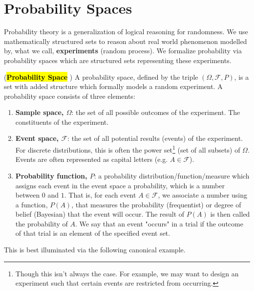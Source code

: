 \section{Probability Spaces} 

Probability theory is a generalization of logical reasoning for randomness. We use mathematically structured sets to reason about real world phenomenon modelled by, what we call, \textbf{experiments} (random process). We formalize probability via probability spaces which are structured sets representing these experiments. 

\begin{df}(\textbf{\hl{Probability Space}} \cite{deisenroth2020mathematics, enwiki:probabilityspace}) 
A probability space, defined by the triple $(\Omega, \mathcal{F}, P)$, is a set with added structure which formally models a random experiment. A probability space consists of three elements:  
\begin{enumerate}
    \item \textbf{Sample space, $\Omega$}: the set of all possible outcomes of the experiment. The constituents of the experiment. 
    \item \textbf{Event space, $\mathcal{F}$}: the set of all potential results (events) of the experiment. For discrete distributions, this is often the power set\footnote{Though this isn't always the case. For example, we may want to design an experiment such that certain events are restricted from occurring.} (set of all subsets) of $\Omega$. Events are often represented as capital letters (e.g. $A \in \mathcal{F}$). 
    \item \textbf{Probability function, $P$}: a probability distribution/function/measure which assigns each event in the event space a probability, which is a number between $0$ and $1$. That is, for each event $A \in \mathcal{F}$, we associate a number using a function, $P(A)$, that measures the probability (frequentist) or degree of belief (Bayesian) that the event will occur. The result of $P(A)$ is then called the probability of $A$. We say that an event "occurs" in a trial if the outcome of that trial is an element of the specified event set. 
\end{enumerate}
\end{df}

This is best illuminated via the following canonical example. 

